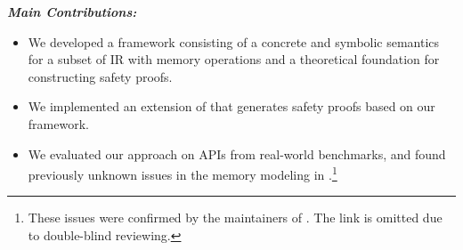 \noindent \textbf{\textit{Main Contributions:}}
\begin{itemize}
    \item We developed a \coq framework consisting of a concrete and symbolic semantics for a subset of \llvm IR with memory operations and a theoretical foundation for constructing safety proofs.
\item We implemented an extension of \klee that generates safety proofs based on our framework.
\item We evaluated our approach on APIs from real-world benchmarks, and found previously unknown issues in the memory modeling in \klee.\footnote{
These issues were confirmed by the maintainers of \klee. The link is omitted due to double-blind reviewing.
}
\end{itemize}



